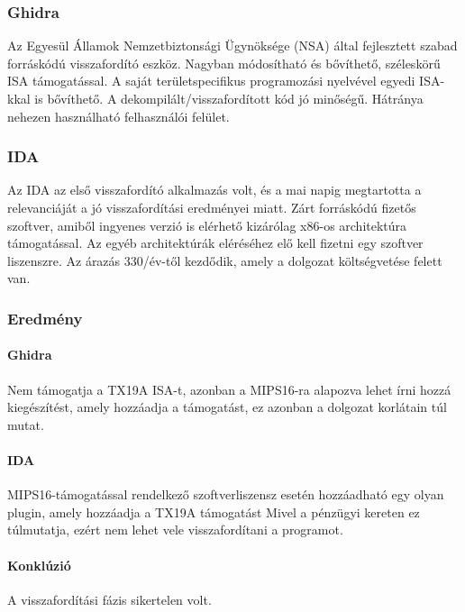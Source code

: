 \subsubsection{Ghidra}
Az Egyesül Államok Nemzetbiztonsági Ügynöksége (NSA) által fejlesztett szabad forráskódú visszafordító eszköz.
Nagyban módosítható és bővíthető, széleskörű ISA támogatással.
A saját területspecifikus programozási nyelvével egyedi ISA-kkal is bővíthető.
A dekompilált/visszafordított kód jó minőségű.
Hátránya nehezen használható felhasználói felület.

\subsubsection{IDA}
Az IDA az első visszafordító alkalmazás volt, és a mai napig megtartotta a relevanciáját a jó visszafordítási eredményei miatt.
Zárt forráskódú fizetős szoftver, amiből ingyenes verzió is elérhető kizárólag x86-os architektúra támogatással.
Az egyéb architektúrák eléréséhez elő kell fizetni egy szoftver liszenszre.
Az árazás 330\texteuro/év-től kezdődik, amely a dolgozat költségvetése felett van.

\subsubsection{Eredmény}
\paragraph{Ghidra}
Nem támogatja a TX19A ISA-t, azonban a MIPS16-ra alapozva lehet írni hozzá kiegészítést, amely hozzáadja a támogatást, ez azonban a dolgozat korlátain túl mutat.
\paragraph{IDA}
MIPS16-támogatással rendelkező szoftverliszensz esetén hozzáadható egy olyan plugin, amely hozzáadja a TX19A támogatást
Mivel a pénzügyi kereten ez túlmutatja, ezért nem lehet vele visszafordítani a programot.

\paragraph{Konklúzió}A visszafordítási fázis sikertelen volt.



